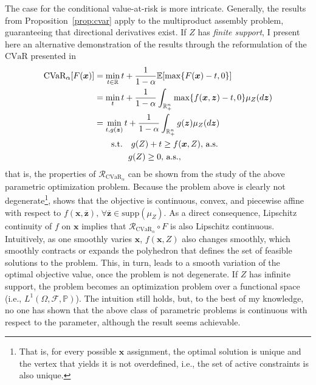 \documentclass[12pt]{article}
\begin{document}
The case for the conditional value-at-risk is more intricate.
Generally, the results from Proposition~\ref{prop:cvar} apply to the multiproduct assembly problem, guaranteeing that directional derivatives exist.
If $Z$ has \emph{finite support}, I present here an alternative demonstration of the results through the reformulation of the $\text{CVaR}$ presented in \citet[Chapter~2.9]{birgeIntroductionStochasticProgramming2011}
\begin{equation}\label{eq:cvar-expansion}
\begin{split}
    \text{CVaR}_\alpha[F(\bm{x})] &= \min_{t\in \mathbb{R}} t + \frac{1}{1-\alpha} \mathbb{E}[\max\{F(\bm{x})-t,0\}] \\
    &= \min_{t} t + \frac{1}{1-\alpha} \int_{\mathbb{R}^{n}_+} \max\{f(\bm{x},\bm{z})-t,0\} \mu_Z(d\bm{z}) \\
    &= \min_{t, g(\bm{z})} t + \frac{1}{1-\alpha} \int_{\mathbb{R}^{n}_+} g(\bm{z}) \mu_Z(d\bm{z}) \\
    &\quad\quad \text{s.t.} \quad g(Z) + t \ge f(\bm{x},Z),\, \text{a.s.} \\
    &\quad\quad \quad \quad g(Z) \ge 0,\, \text{a.s.}
,\end{split}
\end{equation}
that is, the properties of $\mathcal{R}_{\text{CVaR}_\alpha}$ can be shown from the study of the above parametric optimization problem.
Because the problem above is clearly not degenerate\footnote{That is, for every possible $\bm{x}$ assignment, the optimal solution is unique and the vertex that yields it is not overdefined, i.e., the set of active constraints is also unique.}, \citep[Theorem~2.1]{pistikopoulosMultiparametricOptimizationControl2021} shows that the objective is continuous, convex, and piecewise affine with respect to $f(\bm{x},\overline{\bm{z}}),\,\forall \overline{\bm{z}}\in \text{supp}(\mu_Z)$.
As a direct consequence, Lipschitz continuity of $f$ on $\bm{x}$ implies that $\mathcal{R}_{\text{CVaR}_\alpha} \circ F$ is also Lipschitz continuous.
Intuitively, as one smoothly varies $\bm{x}$, $f(\bm{x},Z)$ also changes smoothly, which smoothly contracts or expands the polyhedron that defines the set of feasible solutions to the problem.
This, in turn, leads to a smooth variation of the optimal objective value, once the problem is not degenerate.
If $Z$ has infinite support, the problem becomes an optimization problem over a functional space (i.e., $L^{1}(\Omega,\mathcal{F},\mathbb{P})$).
The intuition still holds, but, to the best of my knowledge, no one has shown that the above class of parametric problems is continuous with respect to the parameter, although the result seems achievable.
\end{document}
